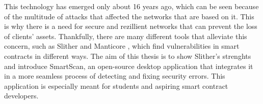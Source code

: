 This technology has emerged only about 16 years ago, which can be seen because of the multitude of attacks that affected the networks that are based on it. This is why there is a need for secure and rezillient networks that can prevent the loss of clients' assets. Thankfully, there are many different tools that alleviate this concern, such as Slither \cite{slither} and Manticore \cite{manticore}, which find vulnerabilities in smart contracts in different ways. The aim of this thesis is to show Slither's strenghts and introduce SmartScan, an open-source desktop application that integrates it in a more seamless process of detecting and fixing security errors. This application is especially meant for students and aspiring smart contract developers.